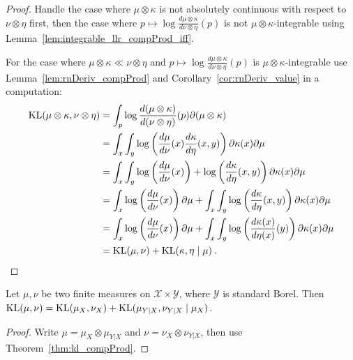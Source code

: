 \begin{proof} \leanok
{}
Handle the case where $\mu \otimes \kappa$ is not absolutely continuous with respect to  $\nu \otimes \eta$ first, then the case where $p \mapsto \log \frac{d \mu \otimes \kappa}{d \nu \otimes \eta}(p)$ is not $\mu \otimes \kappa$-integrable using Lemma~\ref{lem:integrable_llr_compProd_iff}.

For the case where $\mu \otimes \kappa \ll \nu \otimes \eta$ and $p \mapsto \log \frac{d \mu \otimes \kappa}{d \nu \otimes \eta}(p)$ is $\mu \otimes \kappa$-integrable use Lemma~\ref{lem:rnDeriv_compProd} and Corollary~\ref{cor:rnDeriv_value} in a computation:
\begin{align*}
\operatorname{KL}(\mu \otimes \kappa, \nu \otimes \eta)
&= \int_p \log \frac{d(\mu \otimes \kappa)}{d(\nu \otimes \eta)}(p) \partial (\mu \otimes \kappa)
\\
&= \int_x \int_y\log \left(\frac{d\mu}{d \nu}(x)\frac{d\kappa}{d \eta}(x,y)\right) \partial \kappa(x) \partial\mu
\\
&= \int_x \int_y\log \left(\frac{d\mu}{d \nu}(x)\right) + \log \left(\frac{d\kappa}{d \eta}(x,y)\right) \partial \kappa(x) \partial\mu
\\
&= \int_x \log \left(\frac{d\mu}{d \nu}(x)\right)\partial\mu + \int_x \int_y\log \left(\frac{d\kappa}{d \eta}(x,y)\right) \partial \kappa(x) \partial\mu
\\
&= \int_x \log \left(\frac{d\mu}{d \nu}(x)\right)\partial\mu + \int_x \int_y\log \left(\frac{d\kappa(x)}{d \eta(x)}(y)\right) \partial \kappa(x) \partial\mu
\\
&= \operatorname{KL}(\mu, \nu) + \operatorname{KL}(\kappa, \eta \mid \mu)
\: .
\end{align*}

\end{proof}

\begin{theorem}
  \label{thm:kl_fst_add_condKL}
  \leanok
  Let $\mu, \nu$ be two finite measures on $\mathcal X \times \mathcal Y$, where $\mathcal Y$ is standard Borel.
  Then $\operatorname{KL}(\mu, \nu) = \operatorname{KL}(\mu_X, \nu_X) + \operatorname{KL}(\mu_{Y|X}, \nu_{Y|X} \mid \mu_X)$.
\end{theorem}

\begin{proof} \leanok
{}
Write $\mu = \mu_X \otimes \mu_{Y|X}$ and $\nu = \nu_X \otimes \nu_{Y|X}$, then use Theorem~\ref{thm:kl_compProd}.
\end{proof}


